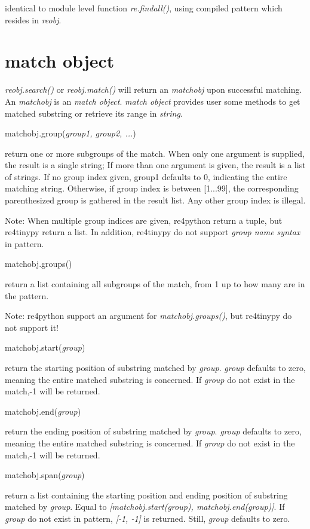 \documentclass[12pt]{article}
\begin{document}
identical to module level function {\em re.findall()}, using compiled pattern which resides in {\em reobj}.

\section{match object}

{\em reobj.search()} or {\em reobj.match()} will return an {\em matchobj} upon successful matching. An {\em matchobj} is an {\em match object}. {\em match object} provides user some methods to get matched substring or retrieve its range in {\em string}.

matchobj.group({\em group1, group2, ...})

return one or more subgroups of the match. When only one argument is supplied, the result is a single string; If more than one argument is given, the result is a list of strings. If no group index given, group1 defaults to 0, indicating the entire matching string. Otherwise, if group index is between [1...99], the corresponding parenthesized group is gathered in the result list. Any other group index is illegal.

Note: When multiple group indices are given, re4python return a tuple, but re4tinypy return a list. In addition, re4tinypy do not support {\em group name syntax} in pattern.


matchobj.groups()

return a list containing all subgroups of the match, from 1 up to how many are in the pattern.

Note: re4python support an argument for {\em matchobj.groups()}, but re4tinypy do not support it!

matchobj.start({\em group})

return the starting position of substring matched by {\em group}. {\em group} defaults to zero, meaning the entire matched substring is concerned. If {\em group} do not exist in the match,-1 will be returned.

matchobj.end({\em group})

return the ending position of substring matched by {\em group}. {\em group} defaults to zero, meaning the entire matched substring is concerned. If {\em group} do not exist in the match,-1 will be returned.


matchobj.span({\em group})

return a list containing the starting position and ending position of substring matched by {\em group}. Equal to {\em [matchobj.start(group), matchobj.end(group)]}. If {\em group} do not exist in pattern, {\em [-1, -1]} is returned. Still, {\em group} defaults to zero.
\end{document}
